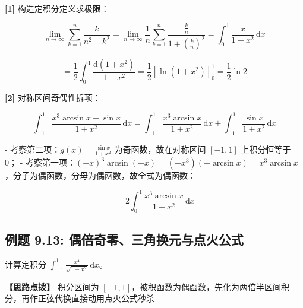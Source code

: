 \documentclass[11pt,a4paper,UTF8]{ctexart}
\begin{document}
\begin{solbox}[分步推导与答题规范]
\textbf{[1]} 构造定积分定义求极限：


\begin{equation*}
\lim_{n \to \infty} \sum_{k=1}^n \frac{k}{n^2+k^2} = \lim_{n \to \infty} \frac{1}{n}\sum_{k=1}^n \frac{\frac{k}{n}}{1+\left(\frac{k}{n}\right)^2} = \int_0^1 \frac{x}{1+x^2}\,\mathrm{d}x
\end{equation*}



\begin{equation*}
= \frac{1}{2}\int_0^1 \frac{\mathrm{d}(1+x^2)}{1+x^2} = \frac{1}{2}\left[\ln(1+x^2)\right]_0^1 = \frac{1}{2}\ln 2
\end{equation*}


\textbf{[2]} 对称区间奇偶性拆项：


\begin{equation*}
\int_{-1}^1 \frac{x^3\arcsin x + \sin x}{1+x^2}\,\mathrm{d}x = \int_{-1}^1 \frac{x^3\arcsin x}{1+x^2}\,\mathrm{d}x + \int_{-1}^1 \frac{\sin x}{1+x^2}\,\mathrm{d}x
\end{equation*}


- 考察第二项：$g(x) = \frac{\sin x}{1+x^2}$ 为奇函数，故在对称区间 $[-1, 1]$ 上积分恒等于 0；
- 考察第一项：$(-x)^3\arcsin(-x) = (-x^3)(-\arcsin x) = x^3\arcsin x$，分子为偶函数，分母为偶函数，故全式为偶函数：


\begin{equation*}
= 2\int_0^1 \frac{x^3\arcsin x}{1+x^2}\,\mathrm{d}x
\end{equation*}

\end{solbox}


\subsection{例题 9.13: 偶倍奇零、三角换元与点火公式}

计算定积分 $\int_{-1}^1 \frac{x^4}{\sqrt{1-x^2}}\,\mathrm{d}x$。

\textbf{\color{DeepPurple}【思路点拨】} 积分区间为 $[-1, 1]$，被积函数为偶函数，先化为两倍半区间积分，再作正弦代换直接动用点火公式秒杀
\end{document}
